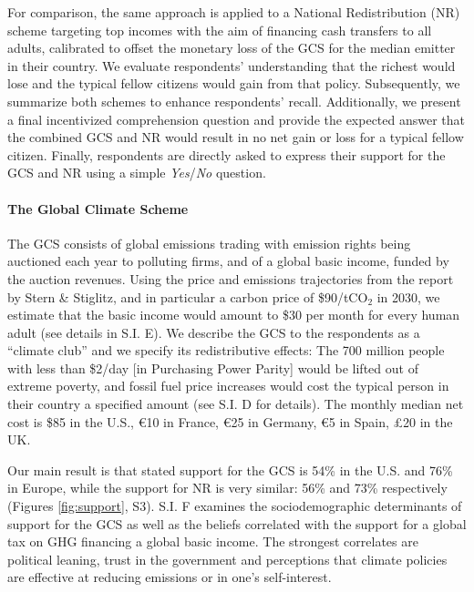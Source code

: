 \documentclass[12pt,english]{article}
\begin{document}
For comparison, %
the same approach is applied to a National Redistribution (NR) scheme targeting top incomes %
with the aim of financing cash transfers to all adults, %
calibrated to offset the monetary loss of the GCS for the median emitter in their country. We evaluate respondents' understanding that the richest would lose and the typical fellow citizens would gain from that policy. %
Subsequently, we summarize both schemes to enhance respondents' recall. Additionally, we present a final incentivized comprehension question and provide the expected answer that the combined GCS and NR would result in no net gain or loss for a typical fellow citizen. Finally, respondents are directly asked to express their support for the GCS and NR using a simple \textit{Yes}/\textit{No} question.

\begin{tcolorbox}\label{box:GCS}
  \paragraph{The Global Climate Scheme} The GCS consists of global emissions trading with emission rights being auctioned each year to polluting firms, and of a global basic income, funded by the auction revenues. Using the price and emissions trajectories from the report by Stern \& Stiglitz,\cite{stern_report_2017} and in particular a carbon price of \$90/tCO$_\text{2}$ in 2030, we estimate that the basic income would amount to \$30 per month for every human adult %
  (see details in S.I. E). %
  We describe the GCS to the respondents as a ``climate club'' and we specify its redistributive effects: The 700 million people with less than \$2/day [in Purchasing Power Parity] would be lifted out of extreme poverty, and fossil fuel price increases would cost the typical person in their country a specified amount (see S.I. D %
  for details). 
  The monthly median net cost is \$85 in the U.S., \euro{}10 in France, \euro{}25 in Germany, \euro{}5 in Spain, £20 in the UK.
\end{tcolorbox}

Our main result is that stated support for the GCS is 54\% in the U.S. and 76\% in Europe, while the support for NR is very similar: 56\% and 73\% respectively (Figures \ref{fig:support}, S3). %
S.I. F 
examines the sociodemographic determinants of support for the GCS as well as the beliefs correlated with the support for a global tax on GHG financing a global basic income. The strongest correlates are political leaning, trust in the government and perceptions that climate policies are effective at reducing emissions or in one's self-interest. 
\end{document}

